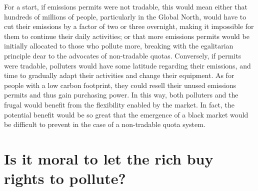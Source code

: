 \documentclass[a5paper,english,openany]{memoir}
\begin{document}
For a start, if emissions permits were not tradable, this would mean either that hundreds of millions of people, particularly in the Global North, %
would have to cut their emissions by a factor of two or three overnight, making it impossible for them to continue their daily activities; or that more emissions permits would be initially allocated  %
to those who pollute more, breaking with the egalitarian principle dear to the advocates of non-tradable quotas. Conversely, if permits were tradable, polluters would have some latitude regarding their emissions, and time to gradually adapt their activities and change their equipment. As for people with a low carbon footprint, they could resell their unused emissions permits and thus gain purchasing power. In this way, both polluters and the frugal would benefit from the flexibility enabled by the market. In fact, the potential benefit would be so great that the emergence of a black market would be difficult to prevent in the case of a non-tradable quota system. 

\section*{\normalsize Is it moral to let the rich buy rights to pollute?}\label{q:moral}
\end{document}
